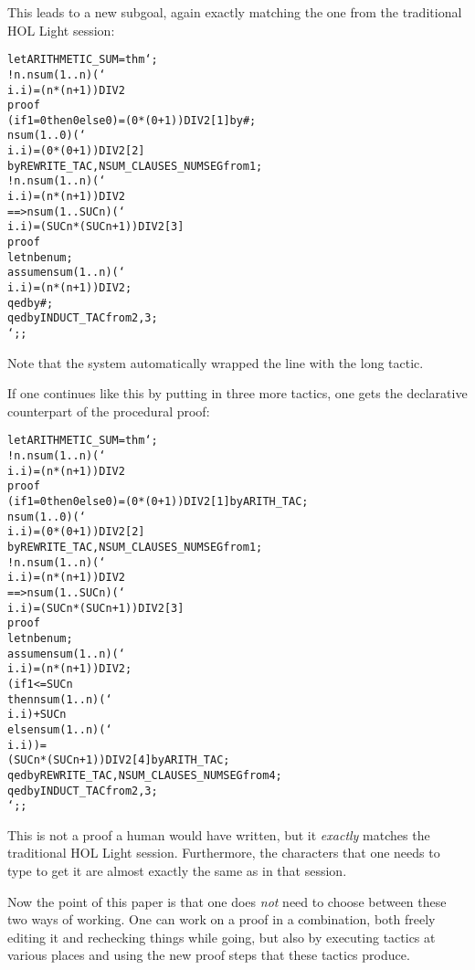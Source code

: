 \documentclass{LMCS}
\let\xmedskip=\medskip
\def\tbar{\hspace{.5pt}\vrule height9.5pt depth4pt width.3pt\hspace{.5pt}}
\def\lam{\char`\\}
\def\}{\char`\}}
\begin{document}
\noindent
This leads to a new subgoal, again exactly matching the one from
the traditional HOL Light session:

\xmedskip
\begin{alltt}\small
let ARITHMETIC_SUM = thm `;
  !n. nsum(1..n) ({\lam}i. i) = (n*(n + 1)) DIV 2
  proof
    (if 1 = 0 then 0 else 0) = (0 * (0 + 1)) DIV 2 [1] by #\tbar;
    nsum (1..0) ({\lam}i. i) = (0 * (0 + 1)) DIV 2 [2]
      by REWRITE_TAC,NSUM_CLAUSES_NUMSEG from 1;
    !n. nsum (1..n) ({\lam}i. i) = (n * (n + 1)) DIV 2
        ==> nsum (1..SUC n) ({\lam}i. i) = (SUC n * (SUC n + 1)) DIV 2 [3]
    proof
      let n be num;
      assume nsum (1..n) ({\lam}i. i) = (n * (n + 1)) DIV 2;
    qed by #;
  qed by INDUCT_TAC from 2,3;
`;;
\end{alltt}
\xmedskip

\noindent
Note that the system automatically wrapped the line with the long tactic.

If one continues like this by putting in three more tactics,
one gets the declarative counterpart of the procedural proof:

\xmedskip
\begin{alltt}\small
let ARITHMETIC_SUM = thm `;
  !n. nsum(1..n) ({\lam}i. i) = (n*(n + 1)) DIV 2
  proof
    (if 1 = 0 then 0 else 0) = (0 * (0 + 1)) DIV 2 [1] by ARITH_TAC;
    nsum (1..0) ({\lam}i. i) = (0 * (0 + 1)) DIV 2 [2]
      by REWRITE_TAC,NSUM_CLAUSES_NUMSEG from 1;
    !n. nsum (1..n) ({\lam}i. i) = (n * (n + 1)) DIV 2
        ==> nsum (1..SUC n) ({\lam}i. i) = (SUC n * (SUC n + 1)) DIV 2 [3]
    proof
      let n be num;
      assume nsum (1..n) ({\lam}i. i) = (n * (n + 1)) DIV 2;
      (if 1 <= SUC n
       then nsum (1..n) ({\lam}i. i) + SUC n
       else nsum (1..n) ({\lam}i. i)) =
      (SUC n * (SUC n + 1)) DIV 2 [4] by ARITH_TAC;
    qed by REWRITE_TAC,NSUM_CLAUSES_NUMSEG from 4;
  qed by INDUCT_TAC from 2,3;
`;;
\end{alltt}
\xmedskip

\noindent
This is
not a proof a human would have written, but it \emph{exactly}
matches the traditional HOL Light session.
Furthermore, the characters that one needs to type to get it
are almost exactly the same as in that session.

Now the point of this paper is that one does \emph{not} need
to choose between these two ways of working.
One can work on a proof in a combination, both freely editing
it and rechecking things while going, but also by executing
tactics at various places and using the new proof steps that these tactics
produce.
\end{document}
